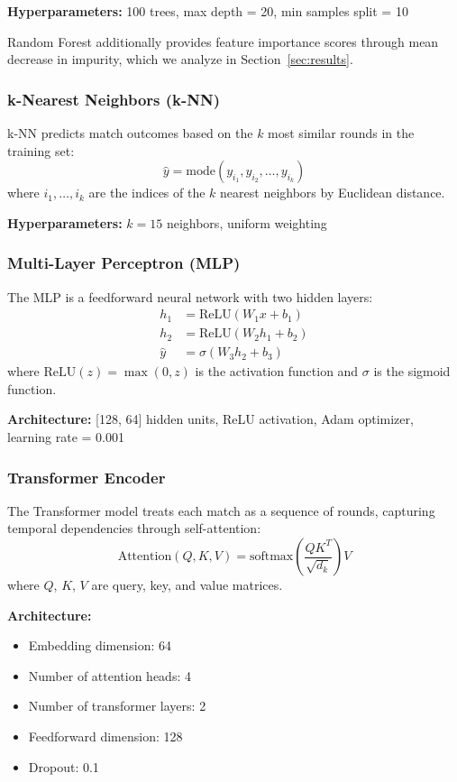 \documentclass[11pt]{article}
\begin{document}
\textbf{Hyperparameters:} 100 trees, max depth = 20, min samples split = 10

Random Forest additionally provides feature importance scores through mean decrease in impurity, which we analyze in Section~\ref{sec:results}.

\subsubsection{k-Nearest Neighbors (k-NN)}

k-NN predicts match outcomes based on the $k$ most similar rounds in the training set:
\begin{equation}
\hat{y} = \text{mode}(y_{i_1}, y_{i_2}, \ldots, y_{i_k})
\end{equation}
where $i_1, \ldots, i_k$ are the indices of the $k$ nearest neighbors by Euclidean distance.

\textbf{Hyperparameters:} $k = 15$ neighbors, uniform weighting

\subsubsection{Multi-Layer Perceptron (MLP)}

The MLP is a feedforward neural network with two hidden layers:
\begin{align}
h_1 &= \text{ReLU}(W_1 x + b_1) \\
h_2 &= \text{ReLU}(W_2 h_1 + b_2) \\
\hat{y} &= \sigma(W_3 h_2 + b_3)
\end{align}
where $\text{ReLU}(z) = \max(0, z)$ is the activation function and $\sigma$ is the sigmoid function.

\textbf{Architecture:} [128, 64] hidden units, ReLU activation, Adam optimizer, learning rate = 0.001

\subsubsection{Transformer Encoder}

The Transformer model treats each match as a sequence of rounds, capturing temporal dependencies through self-attention:
\begin{equation}
\text{Attention}(Q, K, V) = \text{softmax}\left(\frac{QK^T}{\sqrt{d_k}}\right) V
\end{equation}
where $Q$, $K$, $V$ are query, key, and value matrices.

\textbf{Architecture:}
\begin{itemize}
    \item Embedding dimension: 64
    \item Number of attention heads: 4
    \item Number of transformer layers: 2
    \item Feedforward dimension: 128
    \item Dropout: 0.1
\end{itemize}
\end{document}
